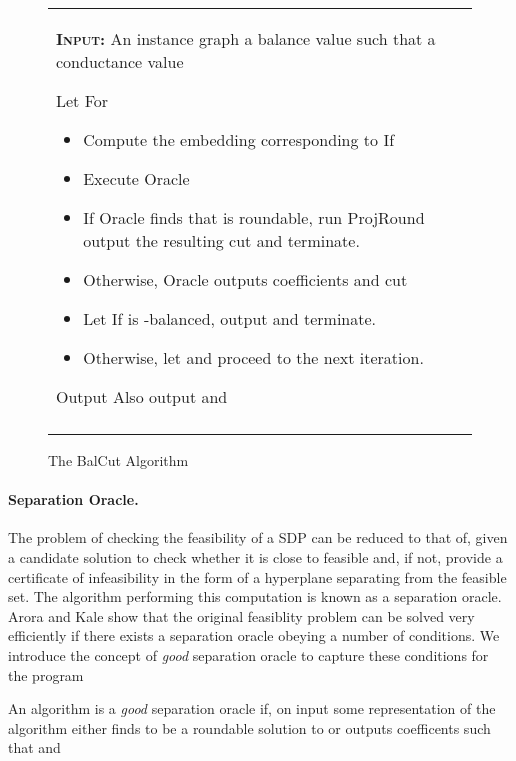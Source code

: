 \documentclass[twoside,leqno,twocolumn]{article}
\newcommand{\SDP}{{\sf SDP}\xspace}
\numberwithin{equation}{section}
\newcommand{\alg}{{\sc BalCut}\xspace}
\begin{document}
\begin{figure*}[htb]
  	\begin{tabularx}{\textwidth}{|X|}
    \hline
	 \vspace{1mm}

  {\bf \textsc{Input:}} An instance graph  a balance value  such that  a conductance value 
	\vspace{1mm}

Let  
	For 
	\begin{itemize}
	\item Compute the embedding  corresponding to  If  
   \item Execute {\sc Oracle}
	
	\item If {\sc Oracle}\xspace finds that  is roundable, run {\sc ProjRound} output the resulting cut and terminate. 
	\item Otherwise, {\sc Oracle}\xspace outputs coefficients  and cut  
	
	\item Let  If  is -balanced, output  and terminate.

	\item Otherwise, let  and proceed to the next iteration.
  \end{itemize}

Output  Also output   and  
\\
\\
\hline 
\end{tabularx}
  \caption{The \alg Algorithm}
  \label{fig:algorithm}
\end{figure*}



\paragraph{Separation Oracle.} The problem of checking the feasibility of a {\SDP} can be reduced to that of, given a candidate solution  to check whether it is close to feasible and, if not, provide a certificate of infeasibility in the form of a hyperplane separating  from the feasible set. The algorithm performing this computation is known as a separation oracle. 
Arora and Kale show that the original feasiblity problem can be solved very efficiently if there exists a separation oracle obeying a number of conditions. We introduce the concept of {\it good} separation oracle to capture these conditions for the program 

\begin{Definition} An algorithm is a {\it good} separation oracle if, on input some representation of  the algorithm either finds  to be a  roundable solution to  or outputs coefficents  such that    and 
\end{Definition}
\end{document}
